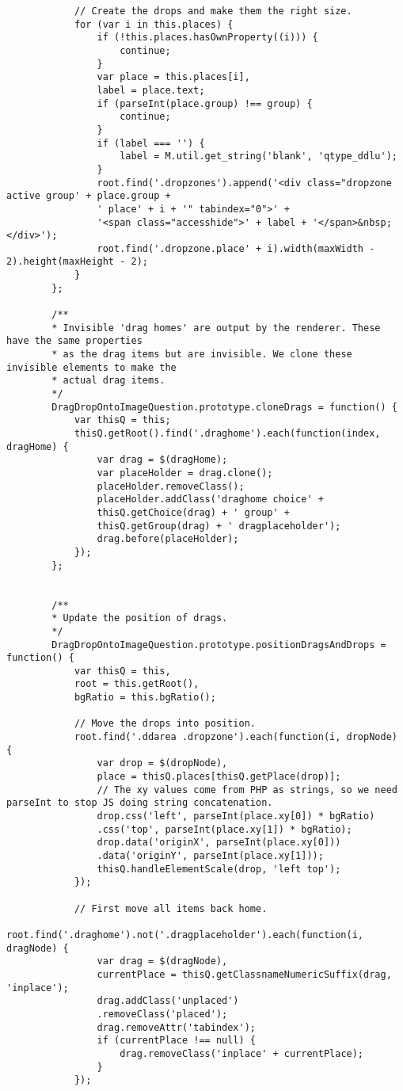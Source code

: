 \begin{lstlisting}
			// Create the drops and make them the right size.
			for (var i in this.places) {
				if (!this.places.hasOwnProperty((i))) {
					continue;
				}
				var place = this.places[i],
				label = place.text;
				if (parseInt(place.group) !== group) {
					continue;
				}
				if (label === '') {
					label = M.util.get_string('blank', 'qtype_ddlu');
				}
				root.find('.dropzones').append('<div class="dropzone active group' + place.group +
				' place' + i + '" tabindex="0">' +
				'<span class="accesshide">' + label + '</span>&nbsp;</div>');
				root.find('.dropzone.place' + i).width(maxWidth - 2).height(maxHeight - 2);
			}
		};
		
		/**
		* Invisible 'drag homes' are output by the renderer. These have the same properties
		* as the drag items but are invisible. We clone these invisible elements to make the
		* actual drag items.
		*/
		DragDropOntoImageQuestion.prototype.cloneDrags = function() {
			var thisQ = this;
			thisQ.getRoot().find('.draghome').each(function(index, dragHome) {
				var drag = $(dragHome);
				var placeHolder = drag.clone();
				placeHolder.removeClass();
				placeHolder.addClass('draghome choice' +
				thisQ.getChoice(drag) + ' group' +
				thisQ.getGroup(drag) + ' dragplaceholder');
				drag.before(placeHolder);
			});
		};
		
		
		/**
		* Update the position of drags.
		*/
		DragDropOntoImageQuestion.prototype.positionDragsAndDrops = function() {
			var thisQ = this,
			root = this.getRoot(),
			bgRatio = this.bgRatio();
			
			// Move the drops into position.
			root.find('.ddarea .dropzone').each(function(i, dropNode) {
				var drop = $(dropNode),
				place = thisQ.places[thisQ.getPlace(drop)];
				// The xy values come from PHP as strings, so we need parseInt to stop JS doing string concatenation.
				drop.css('left', parseInt(place.xy[0]) * bgRatio)
				.css('top', parseInt(place.xy[1]) * bgRatio);
				drop.data('originX', parseInt(place.xy[0]))
				.data('originY', parseInt(place.xy[1]));
				thisQ.handleElementScale(drop, 'left top');
			});
			
			// First move all items back home.
			root.find('.draghome').not('.dragplaceholder').each(function(i, dragNode) {
				var drag = $(dragNode),
				currentPlace = thisQ.getClassnameNumericSuffix(drag, 'inplace');
				drag.addClass('unplaced')
				.removeClass('placed');
				drag.removeAttr('tabindex');
				if (currentPlace !== null) {
					drag.removeClass('inplace' + currentPlace);
				}
			});
			

\end{lstlisting}
